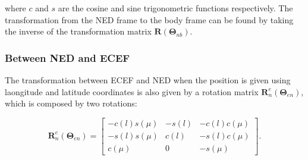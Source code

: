 where $c$ and $s$ are the cosine and sine trigonometric functions respectively. The transformation from the NED frame to the body frame can be found by taking the inverse of the transformation matrix $\mathbf{R}(\bm{\Theta}_{nb})$.

\subsubsection{Between NED and ECEF}

The transformation between ECEF and NED when the position is given using laongitude and latitude coordinates is also given by a rotation matrix $\mathbf{R}_n^e(\bm{\Theta}_{en})$, which is composed by two rotations:

\begin{equation}
	\mathbf{R}_n^e(\bm{\Theta}_{en}) =
	\begin{bmatrix}
		-c(l)s(\mu) & -s(l) & -c(l)c(\mu) \\
		-s(l)s(\mu) & c(l) & -s(l)c(\mu) \\
		c(\mu) & 0 & -s(\mu)
	\end{bmatrix}.
\end{equation}